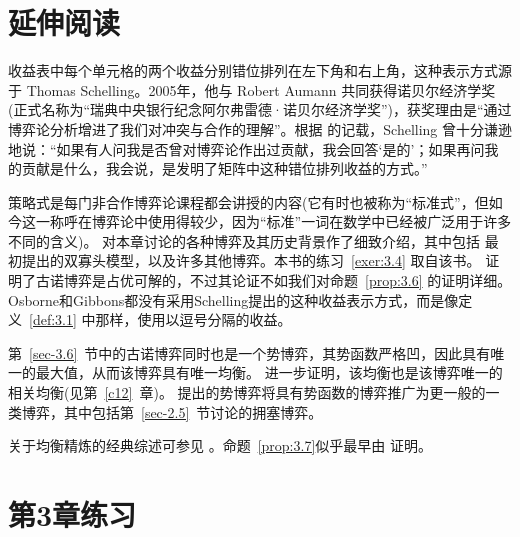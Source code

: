 \section{延伸阅读}

收益表中每个单元格的两个收益分别错位排列在左下角和右上角，这种表示方式源于 Thomas Schelling。2005年，他与 Robert Aumann 共同获得诺贝尔经济学奖(正式名称为“瑞典中央银行纪念阿尔弗雷德·诺贝尔经济学奖”)，获奖理由是“通过博弈论分析增进了我们对冲突与合作的理解”。根据 \citet[p.~90]{dixit1991} 的记载，Schelling 曾十分谦逊地说：“如果有人问我是否曾对博弈论作出过贡献，我会回答‘是的’；如果再问我的贡献是什么，我会说，是发明了矩阵中这种错位排列收益的方式。”

策略式是每门非合作博弈论课程都会讲授的内容(它有时也被称为“标准式”，但如今这一称呼在博弈论中使用得较少，因为“标准”一词在数学中已经被广泛用于许多不同的含义)。\citet{osborne2004} 对本章讨论的各种博弈及其历史背景作了细致介绍，其中包括 \citet{cournot1838} 最初提出的双寡头模型，以及许多其他博弈。本书的练习~\ref{exer:3.4} 取自该书。\citet{gibbons1992} 证明了古诺博弈是占优可解的，不过其论证不如我们对命题~\ref{prop:3.6} 的证明详细。Osborne和Gibbons都没有采用Schelling提出的这种收益表示方式，而是像定义~\ref{def:3.1} 中那样，使用以逗号分隔的收益。

第~\ref{sec-3.6}~节中的古诺博弈同时也是一个势博弈，其势函数严格凹，因此具有唯一的最大值，从而该博弈具有唯一均衡。\citet{neyman1997} 进一步证明，该均衡也是该博弈唯一的相关均衡(见第~\ref{c12}~章)。\citet{monderer1996} 提出的势博弈将具有势函数的博弈推广为更一般的一类博弈，其中包括第~\ref{sec-2.5}~节讨论的拥塞博弈。

关于均衡精炼的经典综述可参见 \citet{vandamme1987}。命题~\ref{prop:3.7}似乎最早由 \citet*[Theorem~1]{cheng2004} 证明。

\section{第3章练习}

